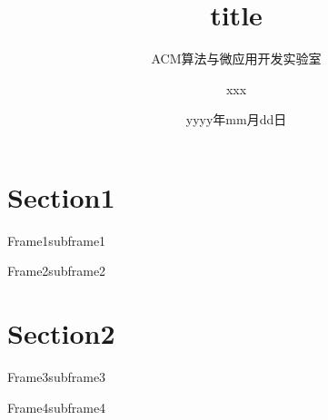 \documentclass[10pt,aspectratio=169]{beamer}
\title{title}
\author{ACM算法与微应用开发实验室 \and xxx}
\date{yyyy年mm月dd日}
\begin{document}
\maketitle

\section{Section1}

\begin{frame}{Frame1}{subframe1}
\end{frame}

\begin{frame}{Frame2}{subframe2}
\end{frame}

\section{Section2}

\begin{frame}{Frame3}{subframe3}
\end{frame}

\begin{frame}{Frame4}{subframe4}
\end{frame}
\end{document}
